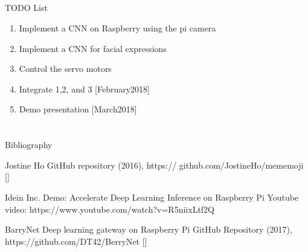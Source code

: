 \documentclass[compress]{beamer}
\begin{document}
\subsection{}
{
\begin{frame}{TODO List}


          \begin{enumerate}
              \item Implement a CNN on Raspberry using the pi camera
              \item Implement a CNN for facial expressions
              \item Control the servo motors 
              \item Integrate 1,2, and 3 [February2018] \\ 
	      \item Demo presentation [March2018]
          \end{enumerate}

\end{frame}
}



\section{}



\begin{frame}{Bibliography}
    \begin{thebibliography}{10}

\beamertemplatearticlebibitems
      Jostine Ho       
      \newblock {}
      \newblock GitHub repository (2016), https:// github.com/JostineHo/mememoji [\href{https:// github.com/JostineHo/mememoji}{\faGithub}]

	Idein Inc.
	\newblock Demo: Accelerate Deep Learning Inference on Raspberry Pi
	\newblock Youtube video: https://www.youtube.com/watch?v=R5niixLtf2Q

	BarryNet
	\newblock Deep learning gateway on Raspberry Pi
	\newblock GitHub Repository (2017), https://github.com/DT42/BerryNet [\href{https://github.com/DT42/BerryNet}{\faGithub}]

    \end{thebibliography}
\end{frame}




\closingtitle


\end{document}
